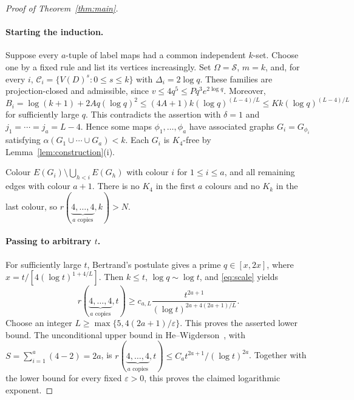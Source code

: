 \documentclass[11pt,a4paper]{article}
\numberwithin{equation}{section}
\newcommand{\cC}{\mathcal C}
\newcommand{\cS}{\mathcal S}
\newcommand{\eps}{\varepsilon}
\begin{document}
\begin{proof}[Proof of Theorem~\ref{thm:main}]
\paragraph{Starting the induction.}
Suppose every $a$-tuple of label maps had a common independent
$k$-set. Choose one by a fixed rule and list its vertices
increasingly. Set $\Omega=\cS$, $m=k$, and, for every $i$,
$\cC_i=\{V(D)^s:0\le s\le k\}$ with
$\Delta_i=2\log q$.
These families are projection-closed and admissible, since
$v\le4q^5\le Pq^3e^{2\log q}$.
Moreover,
\[
 B_i=\log(k+1)+2Aq(\log q)^2
 \le(4A+1)k(\log q)^{(L-4)/L}
 \le Kk(\log q)^{(L-4)/L}
\]
for sufficiently large $q$.
This contradicts the assertion with $\delta=1$ and
$j_1=\cdots=j_a=L-4$.
Hence some maps $\phi_1,\ldots,\phi_a$ have associated graphs
$G_i=G_{\phi_i}$ satisfying
$\alpha(G_1\cup\cdots\cup G_a)<k$.
Each $G_i$ is $K_4$-free by Lemma~\ref{lem:construction}(i).

Colour $E(G_i)\setminus\bigcup_{h<i}E(G_h)$ with colour $i$
for $1\le i\le a$, and all remaining edges with colour $a+1$.
There is no $K_4$ in the first $a$ colours and no $K_k$ in the
last colour, so
$r(\underbrace{4,\ldots,4}_{a\text{ copies}},k)>N$.

\paragraph{Passing to arbitrary $t$.}
For sufficiently large $t$, Bertrand's postulate gives a prime
$q\in[x,2x]$, where $x=t/[4(\log t)^{1+4/L}]$.
Then $k\le t$, $\log q\sim\log t$, and \eqref{eq:scale} yields
\[
 r(\underbrace{4,\ldots,4}_{a\text{ copies}},t)
 \ge c_{a,L}\frac{t^{2a+1}}
 {(\log t)^{2a+4(2a+1)/L}}.
\]
Choose an integer $L\ge\max\{5,4(2a+1)/\eps\}$.
This proves the asserted lower bound.
The unconditional upper bound in
He--Wigderson~\cite[Appendix~B]{HW}, with
$S=\sum_{i=1}^a(4-2)=2a$, is
$r(\underbrace{4,\ldots,4}_{a\text{ copies}},t)
\le C_a t^{2a+1}/(\log t)^{2a}$.
Together with the lower bound for every fixed $\eps>0$, this
proves the claimed logarithmic exponent.
\end{proof}
\end{document}
